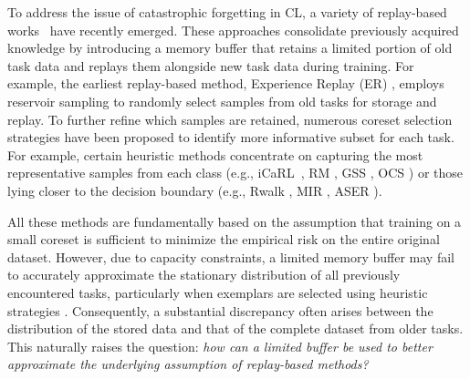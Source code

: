 \documentclass[table, xcdraw]{article}
\theoremstyle{plain}
\theoremstyle{definition}
\theoremstyle{remark}
\begin{document}
To address the issue of catastrophic forgetting in CL, a variety of replay-based works~\cite{ERratcliff1990connectionist,icarl,derpp,clser,RMbang2021rainbow,wu2024meta} have recently emerged. These approaches consolidate previously acquired knowledge by introducing a memory buffer that retains a limited portion of old task data and replays them alongside new task data during training.
For example, the earliest replay-based method, Experience Replay (ER) \cite{ERratcliff1990connectionist}, employs reservoir sampling \cite{Reservoirsamplingvitter1985random} to randomly select samples from old tasks for storage and replay. 
To further refine which samples are retained, numerous coreset selection strategies have been proposed to identify more informative subset for each task. For example, certain heuristic methods concentrate on capturing the most representative samples from each class (e.g., iCaRL~\cite{icarl}, RM \cite{RMbang2021rainbow}, GSS \cite{GSSaljundi2019gradient}, OCS \cite{OCSyoon2021online}) or those lying closer to the decision boundary (e.g., Rwalk \cite{chaudhry2018riemannian}, MIR \cite{aljundi2019online}, ASER \cite{shim2021online}).


All these methods are fundamentally based on the assumption that training on a small coreset is sufficient to minimize the empirical risk on the entire original dataset. However, due to capacity constraints, a limited memory buffer may fail to accurately approximate the stationary distribution of all previously encountered tasks, particularly when exemplars are selected using heuristic strategies \cite{wang2022improving}. Consequently, a substantial discrepancy often arises between the distribution of the stored data and that of the complete dataset from older tasks. This naturally raises the question: \textit{how can a limited buffer be used to better approximate the underlying assumption of replay-based methods?}
\end{document}
